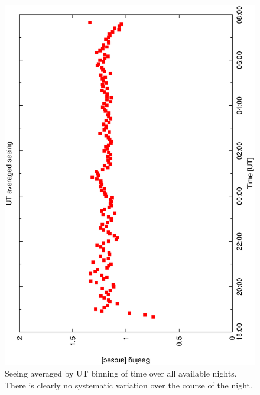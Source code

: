 {{\begin{figure}[htbp]
\begin{center}
    \includegraphics[scale=0.4, angle=-90]{figures/ecs/corr_see_ut.eps}
\end{center} 
\caption[Seeing averaged by UT binning of time over all available nights.]
{Seeing averaged by UT binning of time over all available nights. There is clearly no systematic variation over the course of the night.}
\label{fig:ut_av_seeing}
\end{figure}

}}
